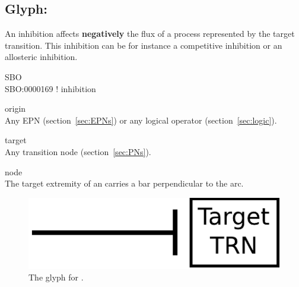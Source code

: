 
\subsection{Glyph: }\label{sec:inhibition}

An inhibition affects \textbf{negatively } the flux of a process represented by the target transition. This inhibition can be for instance a competitive inhibition or an allosteric inhibition. 

\begin{glyphDescription}
 \item[SBO]\mbox{}\\ SBO:0000169 ! inhibition
 \item[origin]\mbox{}\\ Any EPN (section~\ref{sec:EPNs}) or any logical operator (section~\ref{sec:logic}).
 \item[target]\mbox{}\\ Any transition node (section~\ref{sec:PNs}).
 \item[node]\mbox{}\\ The target extremity of an  carries a bar perpendicular to the arc.
 \end{glyphDescription}

\begin{figure}[H]
  \centering
  \includegraphics[scale = 0.5]{images/inhibition}
  \caption{The \PD glyph for .}
  \label{fig:inhibition}
\end{figure}

